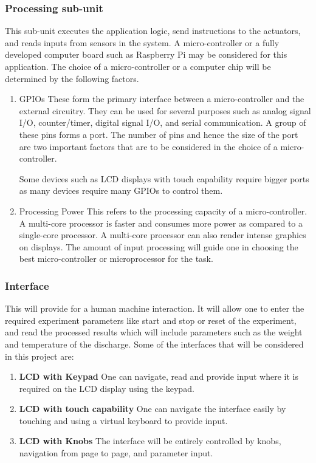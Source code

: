 \subsubsection{Processing sub-unit}
This sub-unit executes the application logic, send instructions to the actuators, and reads inputs from sensors in the system. A micro-controller or a fully developed computer board such as Raspberry Pi may be considered for this application. The choice of a micro-controller or a computer chip will be determined by the following factors. 
\begin{enumerate}
    \item \ac{GPIO}s \newline
    These form the primary interface between a micro-controller and the external circuitry. They can be used for several purposes such as analog signal I/O, counter/timer, digital signal I/O, and serial communication. A group of these pins forms a port. The number of pins and hence the size of the port are two important factors that are to be considered in the choice of a micro-controller. 
    \par
    Some devices such as LCD displays with touch capability require bigger ports as many devices require many GPIOs to control them. 
    \item Processing Power  \newline
    This refers to the processing capacity of a micro-controller. A multi-core processor is faster and consumes more power as compared to a single-core processor. A multi-core processor can also render intense graphics on displays. The amount of input processing will guide one in choosing the best micro-controller or microprocessor for the task.
\end{enumerate}
\subsubsection{Interface}
This will provide for a human machine interaction. It will allow one to enter the required experiment parameters like start and stop or reset of the experiment, and read the processed results which will include parameters such as the weight and temperature of the discharge. Some of the interfaces that will be considered in this project are:
\begin{enumerate}
    \item \textbf{LCD with Keypad} \newline
    One can navigate, read and provide input where it is required on the LCD display using the keypad. 
    \item \textbf{LCD with touch capability} \newline
    One can navigate the interface easily by touching and using a virtual keyboard to provide input.
    \item \textbf{LCD with Knobs} \newline
    The interface will be entirely controlled by knobs, navigation from page to page, and parameter input.
\end{enumerate}


